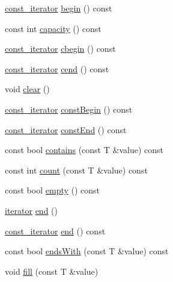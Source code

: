 \begin{DoxyCompactItemize}
\item 
\hyperlink{classprism_1_1_deque_afc2f71fd5b01e963e093f64cc4da94ec}{const\+\_\+iterator} \hyperlink{classprism_1_1_deque_afbb49ba1e2b3e2d59317625675f73106}{begin} () const 
\item 
const int \hyperlink{classprism_1_1_deque_ad787f6064309077863076b7a3c97d1c4}{capacity} () const 
\item 
\hyperlink{classprism_1_1_deque_afc2f71fd5b01e963e093f64cc4da94ec}{const\+\_\+iterator} \hyperlink{classprism_1_1_deque_a9d8d0e555a7113116643c8300bcc2085}{cbegin} () const 
\item 
\hyperlink{classprism_1_1_deque_afc2f71fd5b01e963e093f64cc4da94ec}{const\+\_\+iterator} \hyperlink{classprism_1_1_deque_a6514222d4c6ae657ab4e773c2d33246c}{cend} () const 
\item 
void \hyperlink{classprism_1_1_deque_ad644dd68be09f8070e8bf0821ddb6d9b}{clear} ()
\item 
\hyperlink{classprism_1_1_deque_afc2f71fd5b01e963e093f64cc4da94ec}{const\+\_\+iterator} \hyperlink{classprism_1_1_deque_a78472399e10815032ed009b3c50158c5}{const\+Begin} () const 
\item 
\hyperlink{classprism_1_1_deque_afc2f71fd5b01e963e093f64cc4da94ec}{const\+\_\+iterator} \hyperlink{classprism_1_1_deque_ade2ed985db1b24dd4633ca857d93f64f}{const\+End} () const 
\item 
const bool \hyperlink{classprism_1_1_deque_af86c689901918b3a07e606c644d63d37}{contains} (const T \&value) const 
\item 
const int \hyperlink{classprism_1_1_deque_aeac135daab988ebe38d4a1c8e7e9d193}{count} (const T \&value) const 
\item 
const bool \hyperlink{classprism_1_1_deque_af1d67b91c768fe60b109ffe5f6dda745}{empty} () const 
\item 
\hyperlink{classprism_1_1_deque_af6fbdfa6e826f7f71b29f4d3cfb72ed1}{iterator} \hyperlink{classprism_1_1_deque_a37296b9dc29075a508028e7fe48cf269}{end} ()
\item 
\hyperlink{classprism_1_1_deque_afc2f71fd5b01e963e093f64cc4da94ec}{const\+\_\+iterator} \hyperlink{classprism_1_1_deque_a1a2ba376e9dfc337310efcf7774a16d3}{end} () const 
\item 
const bool \hyperlink{classprism_1_1_deque_acf572b1d8dba0708e794af62a1c594aa}{ends\+With} (const T \&value) const 
\item 
void \hyperlink{classprism_1_1_deque_aa40c9a9b312000990e335e141571e6c6}{fill} (const T \&value)
\item 

\end{DoxyCompactItemize}
